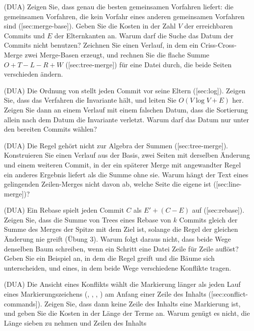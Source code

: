 \startitemize[n]
\item (DUA) Zeigen Sie, dass  genau die besten gemeinsamen Vorfahren liefert:
die gemeinsamen Vorfahren, die kein Vorfahr eines anderen gemeinsamen Vorfahren sind
([sec:merge-base]).
Geben Sie die Kosten in der Zahl $V$ der erreichbaren Commits und $E$ der Elternkanten an.
Warum darf die Suche das Datum der Commits nicht benutzen?
Zeichnen Sie einen Verlauf, in dem ein Criss-Cross-Merge zwei Merge-Basen erzeugt,
und rechnen Sie die flache Summe $O + T - L - R + W$ ([sec:tree-merge])
für eine Datei durch,
die beide Seiten verschieden ändern.
\item (DUA) Die Ordnung von  stellt jeden Commit vor seine Eltern
([sec:log]).
Zeigen Sie, dass das Verfahren die Invariante hält, und leiten Sie $O(V\log V + E)$ her.
Zeigen Sie dann an einem Verlauf mit einem falschen Datum, dass die Sortierung allein nach
dem Datum die Invariante verletzt. Warum darf das Datum nur unter den bereiten Commits wählen?
\item (DUA) Die Regel  gehört nicht zur Algebra
der Summen ([sec:tree-merge]).
Konstruieren Sie einen Verlauf aus der Basis, zwei Seiten mit derselben Änderung und einem
weiteren Commit, in der ein späterer Merge mit angewandter Regel ein anderes Ergebnis
liefert als die Summe ohne sie.
Warum hängt der Text eines gelingenden Zeilen-Merges nicht davon ab, welche Seite die eigene ist
([sec:line-merge])?
\item (DUA) Ein Rebase spielt jeden Commit $C$ als $E' + (C - E)$ auf
([sec:rebase]).
Zeigen Sie, dass die Summe von Trees eines Rebase von $k$ Commits gleich der Summe des Merges
der Spitze mit dem Ziel ist, solange die Regel der gleichen Änderung nie greift (Übung 3).
Warum folgt daraus nicht, dass beide Wege denselben Baum schreiben, wenn ein Schritt eine Datei
Zeile für Zeile auflöst? Geben Sie ein Beispiel an, in dem die Regel greift und die Bäume
sich unterscheiden, und eines, in dem beide Wege verschiedene Konflikte tragen.
\item (DUA) Die Ansicht eines Konflikts wählt die Markierung länger als jeden Lauf eines
Markierungszeichens (\type{<}, \type{+}, \type{-}, \type{>}) am Anfang einer Zeile des Inhalts
([sec:conflict-commands]).
Zeigen Sie, dass dann keine Zeile des Inhalts eine Markierung ist, und geben Sie die Kosten in der
Länge der Terme an. Warum genügt es nicht, die Länge sieben zu nehmen und Zeilen des Inhalts

